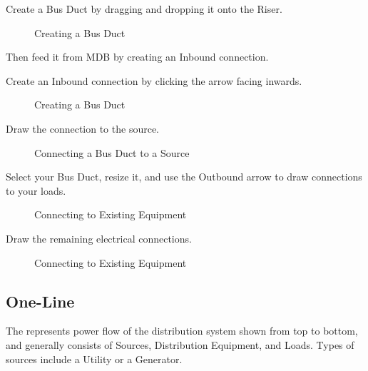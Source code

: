 \documentclass[letterpaper,10pt,english]{sphinxmanual}
\begin{document}
Create a Bus Duct by dragging and dropping it onto the Riser.

\begin{figure}[H]
\centering
\capstart

\noindent{}
\caption{Creating a Bus Duct}\label{\detokenize{docs/userguide/buildingelectricalmodel/riser/index-riser:id31}}\end{figure}

Then feed it from MDB by creating an Inbound connection.

Create an Inbound connection by clicking the arrow facing inwards.

\begin{figure}[H]
\centering
\capstart

\noindent{}
\caption{Creating a Bus Duct}\label{\detokenize{docs/userguide/buildingelectricalmodel/riser/index-riser:id32}}\end{figure}

Draw the connection to the source.

\begin{figure}[H]
\centering
\capstart

\noindent{}
\caption{Connecting a Bus Duct to a Source}\label{\detokenize{docs/userguide/buildingelectricalmodel/riser/index-riser:id33}}\end{figure}

Select your Bus Duct, resize it, and use the Outbound arrow to draw connections to your loads.

\begin{figure}[H]
\centering
\capstart

\noindent{}
\caption{Connecting to Existing Equipment}\label{\detokenize{docs/userguide/buildingelectricalmodel/riser/index-riser:id34}}\end{figure}

Draw the remaining electrical connections.

\begin{figure}[H]
\centering
\capstart

\noindent{}
\caption{Connecting to Existing Equipment}\label{\detokenize{docs/userguide/buildingelectricalmodel/riser/index-riser:id35}}\end{figure}


\subsection{One-Line}
\label{\detokenize{docs/userguide/index-user_guide:one-line}}\label{\detokenize{docs/userguide/buildingelectricalmodel/one-line/index-one-line:one-line}}
The {\hyperref[\detokenize{docs/userguide/buildingelectricalmodel/one-line/index-one-line:one-line}]{}} represents power flow of the distribution system shown from top to bottom, and generally consists of Sources, Distribution Equipment, and Loads.  Types of sources include a Utility or a Generator.
\end{document}
